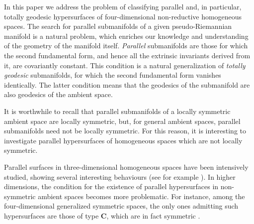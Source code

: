 \documentclass{amsart}
\theoremstyle{plain}
\theoremstyle{remark}
\begin{document}
In this paper we address the problem of classifying parallel and, in particular, totally geodesic hypersurfaces of four-dimensional non-reductive homogeneous spaces. The search for parallel submanifolds of a given pseudo-Riemannian manifold is a natural problem, which enriches our knowledge and understanding of the geometry of the manifold itself. \textit{Parallel} submanifolds are those for which the second fundamental form, and hence all the extrinsic invariants derived from it, are covariantly constant. This condition is a natural generalization of \textit{totally geodesic} submanifolds, for which the second fundamental form vanishes identically. The latter condition means that the geodesics of the submanifold are also geodesics of the ambient space. 

It is worthwhile to recall that parallel submanifolds of a locally symmetric ambient space are locally symmetric, but, for general ambient spaces, parallel submanifolds need not be locally symmetric. For this reason, it is interesting to investigate parallel hypersurfaces of homogeneous spaces which are not locally symmetric. 

Parallel surfaces in three-dimensional homogeneous spaces have been intensively studied, showing several interesting behaviours (see for example \cite{CVdV1,CVdV2,CVdV4,CVdV5}). In higher dimensions, the condition for the existence of parallel hypersurfaces in non-symmetric ambient spaces becomes more problematic. For instance, among the four-dimensional generalized symmetric spaces, the only ones admitting such hypersurfaces are those of type $\textbf{C}$, which are in fact symmetric \cite{DdV}. 
\end{document}
